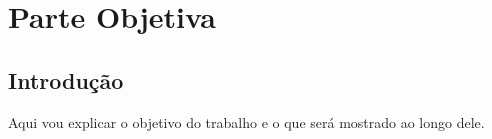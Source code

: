 
\chapter{Parte Objetiva}

\section{Introdução}

Aqui vou explicar o objetivo do trabalho e o que será mostrado ao longo dele.

\clearpage